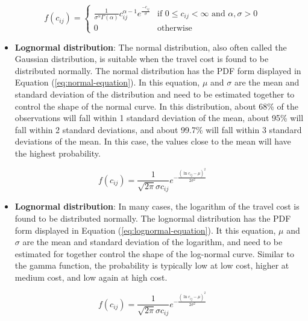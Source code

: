 \documentclass[preprint, 3p,
authoryear]{elsarticle} %
\providecommand{\tightlist}{%
  \setlength{\itemsep}{0pt}\setlength{\parskip}{0pt}}
\begin{document}
\begin{equation}
f(c_{ij}) = 
   \begin{cases}
\frac{1}{\sigma^\alpha\Gamma(\alpha)} c_{ij}^{\alpha-1} e^{\frac{-c_{ij}}{\sigma}} & \text{if } 0 \leq c_{ij} <      \infty  \text{ and } \alpha, \sigma > 0 \\ 0 & \text{otherwise}
   \end{cases}
\label{eq:gamma-equation}
\end{equation}

\begin{itemize}
\tightlist
\item
  \textbf{Lognormal distribution}: The normal distribution, also often
  called the Gaussian distribution, is suitable when the travel cost is
  found to be distributed normally. The normal distribution has the PDF
  form displayed in Equation (\ref{eq:normal-equation}). In this
  equation, \(\mu\) and \(\sigma\) are the mean and standard deviation
  of the distribution and need to be estimated together to control the
  shape of the normal curve. In this distribution, about 68\% of the
  observations will fall within 1 standard deviation of the mean, about
  95\% will fall within 2 standard deviations, and about 99.7\% will
  fall within 3 standard deviations of the mean. In this case, the
  values close to the mean will have the highest probability.
\end{itemize}

\begin{equation}
f(c_{ij}) = \frac{1}{\sqrt{2\pi} \sigma c_{ij}} e^{-\frac{(\ln c_{ij} - \mu)^2}{2\sigma^2}}
\label{eq:normal-equation}
\end{equation}

\begin{itemize}
\tightlist
\item
  \textbf{Lognormal distribution}: In many cases, the logarithm of the
  travel cost is found to be distributed normally. The lognormal
  distribution has the PDF form displayed in Equation
  (\ref{eq:lognormal-equation}). It this equation, \(\mu\) and
  \(\sigma\) are the mean and standard deviation of the logarithm, and
  need to be estimated for together control the shape of the log-normal
  curve. Similar to the gamma function, the probability is typically low
  at low cost, higher at medium cost, and low again at high cost.
\end{itemize}

\begin{equation}
f(c_{ij}) = \frac{1}{\sqrt{2\pi} \sigma c_{ij}} e^{-\frac{(\ln c_{ij} - \mu)^2}{2\sigma^2}}
\label{eq:lognormal-equation}
\end{equation}
\end{document}
